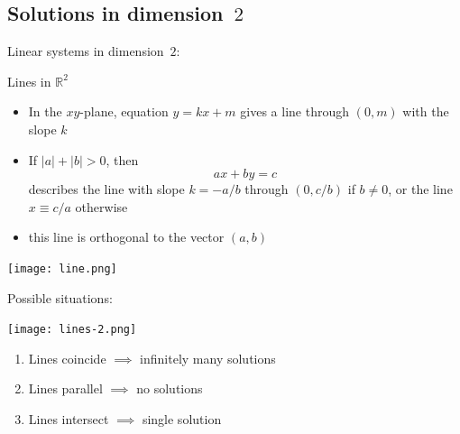 \documentclass%
[handout]%
{beamer}
\newcommand{\bR}{{\mathbb R}}
\begin{document}
\subsection{Solutions in dimension~$2$}

\begin{frame}[label=dim2]{Linear systems in dimension~$2$:}

\vspace*{-8pt}

\begin{block}{Lines in $\bR^2$}
\begin{itemize}
  \item  In the $xy$-plane, equation $y = kx + m$ gives a line through $(0,m)$ with the slope $k$
  \item  If $|a|+|b|>0$, then\\[-10pt]
\[
    ax + by = c
\]
describes the line with slope $k=-a/b$ through $(0,c/b)$ if $b\ne0$,  or the line $x\equiv c/a$ otherwise
  \item this line is orthogonal to the vector $(a,b)$
\end{itemize}
\end{block}

\vspace*{-5pt}

\begin{center}\texttt{[image: line.png]}
\end{center}

\end{frame}


\begin{frame}[label=possibilities2]{Possible situations:}


\begin{center}\texttt{[image: lines-2.png]}
\end{center}

\begin{enumerate}
  \item Lines coincide \hspace{1pt}$\implies$ infinitely many solutions
  \item Lines parallel \hspace{3pt} $\implies$ no solutions
  \item Lines intersect $\implies$ single solution
\end{enumerate}

\end{frame}
\end{document}
